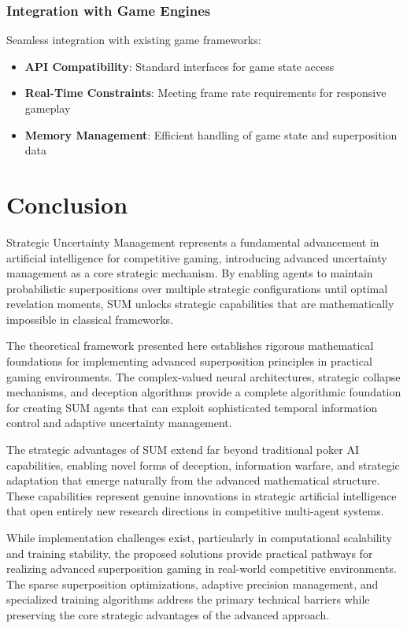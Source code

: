 \documentclass[11pt,a4paper]{article}
\begin{document}
\subsubsection{Integration with Game Engines}

Seamless integration with existing game frameworks:

\begin{itemize}
\item \textbf{API Compatibility}: Standard interfaces for game state access
\item \textbf{Real-Time Constraints}: Meeting frame rate requirements for responsive gameplay
\item \textbf{Memory Management}: Efficient handling of game state and superposition data
\end{itemize}

\section{Conclusion}

Strategic Uncertainty Management represents a fundamental advancement in artificial intelligence for competitive gaming, introducing advanced uncertainty management as a core strategic mechanism. By enabling agents to maintain probabilistic superpositions over multiple strategic configurations until optimal revelation moments, SUM unlocks strategic capabilities that are mathematically impossible in classical frameworks.

The theoretical framework presented here establishes rigorous mathematical foundations for implementing advanced superposition principles in practical gaming environments. The complex-valued neural architectures, strategic collapse mechanisms, and deception algorithms provide a complete algorithmic foundation for creating SUM agents that can exploit sophisticated temporal information control and adaptive uncertainty management.

The strategic advantages of SUM extend far beyond traditional poker AI capabilities, enabling novel forms of deception, information warfare, and strategic adaptation that emerge naturally from the advanced mathematical structure. These capabilities represent genuine innovations in strategic artificial intelligence that open entirely new research directions in competitive multi-agent systems.

While implementation challenges exist, particularly in computational scalability and training stability, the proposed solutions provide practical pathways for realizing advanced superposition gaming in real-world competitive environments. The sparse superposition optimizations, adaptive precision management, and specialized training algorithms address the primary technical barriers while preserving the core strategic advantages of the advanced approach.
\end{document}
